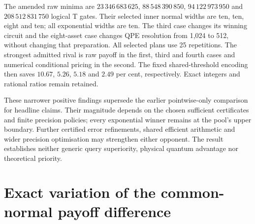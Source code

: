 \documentclass[11pt]{article}
\begin{document}
The amended raw minima are $23\,346\,683\,625$,
$88\,548\,390\,850$, $94\,122\,973\,950$ and
$208\,512\,831\,750$ logical T gates. Their selected inner normal widths
are ten, ten, eight and ten; all exponential widths are ten. The third
case changes its winning circuit and the eight-asset case changes QPE
resolution from 1,024 to 512, without changing that preparation. All
selected plans use 25 repetitions. The strongest admitted rival is raw
payoff in the first, third and fourth cases and numerical conditional
pricing in the second. The fixed shared-threshold encoding then saves
$10.67$, $5.26$, $5.18$ and $2.49$ per cent, respectively. Exact integers
and rational ratios remain retained.

These narrower positive findings supersede the earlier pointwise-only
comparison for headline claims. Their magnitude depends on the chosen
sufficient certificates and finite precision policies; every exponential
winner remains at the pool's upper boundary. Further certified error
refinements, shared efficient arithmetic and wider precision optimisation
may strengthen either opponent. The result establishes neither generic
query superiority, physical quantum advantage nor theoretical priority.

\appendix
\section{Exact variation of the common-normal payoff difference}
\label{sec:raw-exact-variation}
\end{document}
